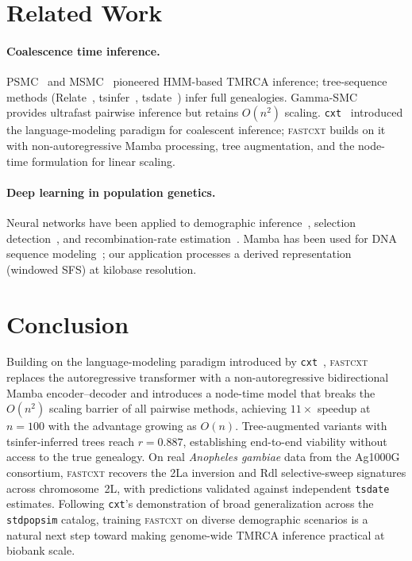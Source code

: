 \documentclass{article}
\begin{document}
\section{Related Work}

\paragraph{Coalescence time inference.}
PSMC~\citep{li2011inference} and MSMC~\citep{schiffels2014inferring} pioneered HMM-based TMRCA
inference; tree-sequence methods (Relate~\citep{speidel2019method},
tsinfer~\citep{kelleher2019inferring}, tsdate~\citep{wohns2022unified}) infer full genealogies.
Gamma-SMC~\citep{schweiger2023ultrafast} provides ultrafast pairwise inference but retains
$O(n^2)$ scaling. \texttt{cxt}~\citep{korfmann2025cxt} introduced the language-modeling
paradigm for coalescent inference; \textsc{fastcxt} builds on it with non-autoregressive
Mamba processing, tree augmentation, and the node-time formulation for linear scaling.

\paragraph{Deep learning in population genetics.}
Neural networks have been applied to demographic inference~\citep{flagel2019unreasonable},
selection detection~\citep{kern2018diploShic}, and recombination-rate
estimation~\citep{adrion2020community}. Mamba has been used for DNA sequence
modeling~\citep{schiff2024caduceus}; our application processes a derived representation
(windowed SFS) at kilobase resolution.

\section{Conclusion}

Building on the language-modeling paradigm introduced by \texttt{cxt}~\citep{korfmann2025cxt},
\textsc{fastcxt} replaces the autoregressive transformer with a non-autoregressive
bidirectional Mamba encoder--decoder and introduces a node-time model that breaks the $O(n^2)$
scaling barrier of all pairwise methods, achieving $11\times$ speedup at $n=100$ with the
advantage growing as $O(n)$. Tree-augmented variants with tsinfer-inferred trees reach
$r = 0.887$, establishing end-to-end viability without access to the true genealogy.
On real \emph{Anopheles gambiae} data from the Ag1000G consortium, \textsc{fastcxt}
recovers the 2La inversion and Rdl selective-sweep signatures across chromosome~2L,
with predictions validated against independent \texttt{tsdate} estimates. Following
\texttt{cxt}'s demonstration of broad generalization across the \texttt{stdpopsim} catalog,
training \textsc{fastcxt} on diverse demographic scenarios is a natural next step toward
making genome-wide TMRCA inference practical at biobank scale.
\end{document}
